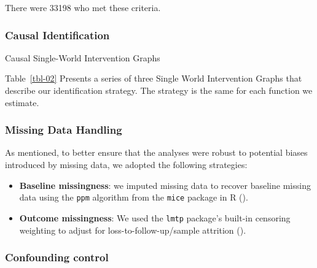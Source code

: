 \documentclass[
  single column]{article}
\providecommand{\tightlist}{%
  \setlength{\itemsep}{0pt}\setlength{\parskip}{0pt}}\usepackage{longtable,booktabs,array}
\begin{document}
There were 33198 who met these criteria.

\subsubsection{Causal Identification}\label{causal-identification}

\begin{table}

\caption{\label{tbl-02}Causal Single-World Intervention Graphs}

\centering{

\lmtptablethree

}

\end{table}%

Table~\ref{tbl-02} Presents a series of three Single World Intervention
Graphs that describe our identification strategy. The strategy is the
same for each function we estimate.

\subsubsection{Missing Data Handling}\label{missing-data-handling}

As mentioned, to better ensure that the analyses were robust to
potential biases introduced by missing data, we adopted the following
strategies:

\begin{itemize}
\tightlist
\item
  \textbf{Baseline missingness}: we imputed missing data to recover
  baseline missing data using the \texttt{ppm} algorithm from the
  \texttt{mice} package in R ().
\item
  \textbf{Outcome missingness}: We used the \texttt{lmtp} package's
  built-in censoring weighting to adjust for loss-to-follow-up/sample
  attrition ().
\end{itemize}

\subsubsection{Confounding control}\label{confounding-control}
\end{document}
